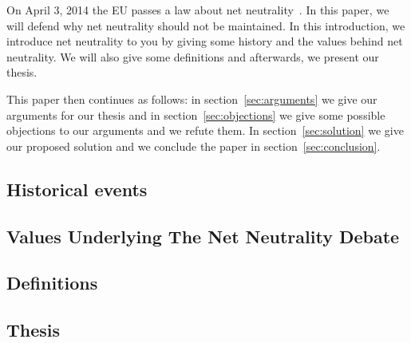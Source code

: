 
On April 3, 2014 the EU passes a law about net neutrality~\highlight{[cite]}. In this paper, we will defend why net neutrality should not be maintained. In this introduction, we introduce net neutrality to you by giving some history and the values behind net neutrality. We will also give some definitions and afterwards, we present our thesis.

This paper then continues as follows: in section~\ref{sec:arguments} we give our arguments for our thesis and in section~\ref{sec:objections} we give some possible objections to our arguments and we refute them. In section~\ref{sec:solution} we give our proposed solution and we conclude the paper in section~\ref{sec:conclusion}.

\subsection{Historical events}
\label{sec:intro_problem}


\subsection{Values Underlying The Net Neutrality Debate}
\label{sec:values}


\subsection{Definitions}
\label{sec:intro_def}


\subsection{Thesis}
\label{sec:intro_thesis}
